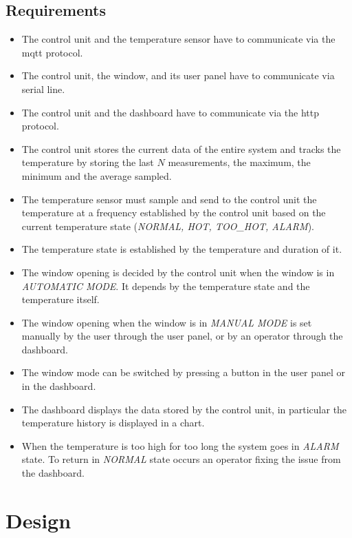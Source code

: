 \documentclass[a4paper,12pt]{report}
\begin{document}
    \section{Requirements}

        \begin{itemize}
            \item The control unit and the temperature sensor have to communicate via the mqtt protocol.
            \item The control unit, the window, and its user panel have to communicate via serial line.
            \item The control unit and the dashboard have to communicate via the http protocol.
            \item The control unit stores the current data of the entire system and tracks the temperature by storing the last
            $N$ measurements, the maximum, the minimum and the average sampled.
            \item The temperature sensor must sample and send to the control unit the temperature at a frequency established by
            the control unit based on the current temperature state (\textit{NORMAL, HOT, TOO\_HOT, ALARM}).
            \item The temperature state is established by the temperature and duration of it.
            \item The window opening is decided by the control unit when the window is in \textit{AUTOMATIC MODE}. It depends by
            the temperature state and the temperature itself.
            \item The window opening when the window is in \textit{MANUAL MODE} is set manually by the user through the user panel,
            or by an operator through the dashboard.
            \item The window mode can be switched by pressing a button in the user panel or in the dashboard.
            \item The dashboard displays the data stored by the control unit, in particular the temperature history is displayed
            in a chart.
            \item When the temperature is too high for too long the system goes in \textit{ALARM} state. To return in
            \textit{NORMAL} state occurs an operator fixing the issue from the dashboard.
        \end{itemize}


        \chapter{Design}
\end{document}
